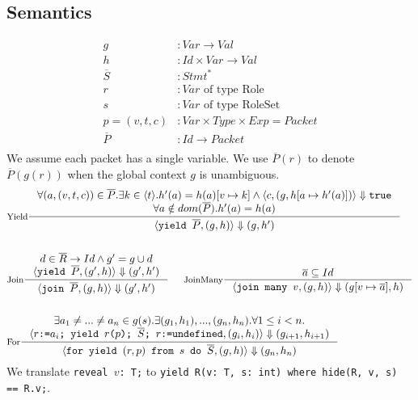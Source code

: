 \documentclass[acmsmall,review,anonymous]{acmart}\settopmatter{printfolios=true,printccs=false,printacmref=false}
\begin{document}
\subsection{Semantics}
\begin{align*}
  g &\colon Var \to Val \\
  h &\colon Id \times Var \to Val \\
  \overline{S} &\colon Stmt^\ast \\
  r &\colon Var \text{ of type Role} \\
  s &\colon Var \text{ of type RoleSet} \\
  p = (v, t, c) &\colon Var \times Type \times Exp = Packet \\
  \overline{P} &\colon Id \to Packet \\
\end{align*}
We assume each packet has a single variable. We use $\overline{P}(r)$ to denote $\overline{P}(g(r))$ when the global context $g$ is unambiguous.
\begin{align*}
  &\inference[Yield]{
    \forall (a, (v, t, c)) \in \overline{P} . \exists k \in \langle t \rangle . h'(a) = h(a)[v \mapsto k] \land \langle c, (g, h[a \mapsto h'(a)]) \rangle \Downarrow \texttt{true} \\
    \forall a \notin dom(\overline{P}) . h'(a) = h(a)
  }{
    \langle \texttt{yield $\overline{P}$}, (g, h) \rangle \Downarrow (g, h')
  }\\ \\
  &\inference[Join]{
    d \in \overline{R} \to Id \land g' = g \cup d\\
    \langle \texttt{yield $\overline{P}$}, (g', h) \rangle \Downarrow (g', h')
  }{
    \langle \texttt{join $\overline{P}$}, (g, h) \rangle \Downarrow (g', h')
  }\;\;\;\;\;
  \inference[JoinMany]{
    \overline{a} \subseteq Id
  }{
    \langle \texttt{join many $v$}, (g, h) \rangle \Downarrow (g[v \mapsto \overline{a}], h)
  }\\ \\
  &\inference[For]{
    \exists a_1 \neq ... \neq a_n \in g(s) . \exists (g_1, h_1), ..., (g_n, h_n) . \forall 1 \leq i < n . \\
    \langle \texttt{$r$:=$a_i$; yield $r$($p$); $\overline{S}$; $r$:=undefined}, (g_i, h_i) \rangle \Downarrow (g_{i+1}, h_{i+1})
  }{
    \langle \texttt{for yield $(r, p)$ from $s$ do $\overline{S}$}, (g, h) \rangle \Downarrow (g_n, h_n)
  } \\
\end{align*}
We translate \texttt{reveal $v$: T;} to \texttt{yield R(v: T, s: int) where hide(R, v, s) == R.v;}.
\end{document}
